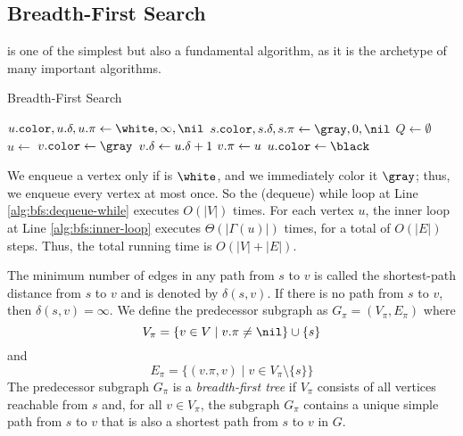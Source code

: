 \subsection{Breadth-First Search}
\label{sec:bfs}

 is one of the simplest but also a fundamental algorithm, as it is the archetype of many important algorithms.


\begin{algorithm}[h]
\caption{Breadth-First Search}\label{alg:bfs}
\begin{algorithmic}[1]
 
    \State $\attrib{u}{color},\attribnormal{u}{\delta},\attrib{u}{\pi}\gets \white,\infty,\nil$
  \EndFor
  \State $\attrib{s}{color},\attribnormal{s}{\delta},\attrib{s}{\pi}\gets \gray,0,\nil$
  \State $Q\gets\emptyset$ 
  \State {}
   \label{alg:bfs:dequeue-while}
    \State $u\gets$ 
     \label{alg:bfs:inner-loop}
        \State $\attrib{v}{color}\gets\gray$
        \State $v\mathtt{.}\delta\gets u\mathtt{.}\delta+1$
        \State $v\mathtt{.}\mathtt{\pi}\gets u$
        \State {}
      \EndIf
    \EndFor
    \State $\attrib{u}{color}\gets\black$
  \EndWhile
\EndFunction
\end{algorithmic}
\end{algorithm}

We enqueue a vertex only if is $\white$, and we immediately color it $\gray$; thus, we enqueue every vertex at most once.
So the (dequeue) while loop at Line \ref{alg:bfs:dequeue-while} executes \(O(|V|)\) times.
For each vertex \(u\), the inner loop at Line \ref{alg:bfs:inner-loop} executes \(\Theta(|\Gamma(u)|)\) times, for a total of \(O(|E|)\) steps.
Thus, the total running time is \(O(|V| + |E|)\).

The minimum number of edges in any path from \(s\) to \(v\) is called the shortest-path distance from \(s\) to \(v\) and is denoted by \(\delta(s,v)\).
If there is no path from \(s\) to \(v\), then \(\delta(s,v) = \infty\).
We define the predecessor subgraph as \(G_\pi=(V_\pi,E_\pi)\) where
\[
V_\pi = \{v\in V\mid v.\pi \neq \nil \} \cup \{s\}
\]
and
\[
E_\pi = \{(v.\pi,v)\mid v\in V_\pi \setminus \{s\}\}
\]
The predecessor subgraph \(G_\pi\) is a \emph{breadth-first tree} if \(V_\pi\) consists of all vertices reachable from \(s\) and, for all \(v\in V_\pi\), the subgraph \(G_\pi\) contains a unique simple path from \(s\) to \(v\) that is also a shortest path from \(s\) to \(v\) in \(G\).

